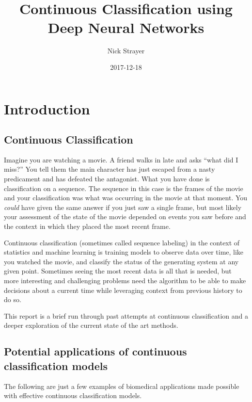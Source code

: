 \documentclass[]{book}
\title{Continuous Classification using Deep Neural Networks}
\author{Nick Strayer}
\date{2017-12-18}
\theoremstyle{definition}
\theoremstyle{definition}
\theoremstyle{definition}
\theoremstyle{remark}
\begin{document}
\maketitle

{
\setcounter{tocdepth}{1}
\tableofcontents
}
\chapter{Introduction}\label{intro}

\section{Continuous Classification}\label{continuous-classification}

Imagine you are watching a movie. A friend walks in late and asks ``what
did I miss?'' You tell them the main character has just escaped from a
nasty predicament and has defeated the antagonist. What you have done is
classification on a sequence. The sequence in this case is the frames of
the movie and your classification was what was occurring in the movie at
that moment. You \emph{could} have given the same answer if you just saw
a single frame, but most likely your assessment of the state of the
movie depended on events you saw before and the context in which they
placed the most recent frame.

Continuous classification (sometimes called sequence labeling) in the
context of statistics and machine learning is training models to observe
data over time, like you watched the movie, and classify the status of
the generating system at any given point. Sometimes seeing the most
recent data is all that is needed, but more interesting and challenging
problems need the algorithm to be able to make decisions about a current
time while leveraging context from previous history to do so.

This report is a brief run through past attempts at continuous
classification and a deeper exploration of the current state of the art
methods.

\section{Potential applications of continuous classification
models}\label{potential-applications-of-continuous-classification-models}

The following are just a few examples of biomedical applications made
possible with effective continuous classification models.
\end{document}
